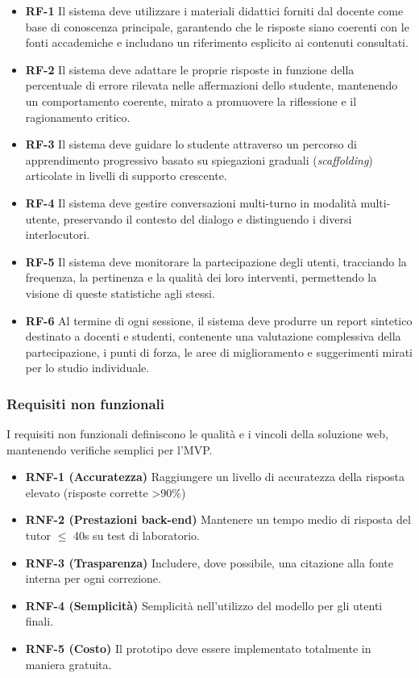 \documentclass[a4paper,9pt]{article}
\begin{document}
	\begin{itemize}
		\item \textbf{RF-1} Il sistema deve utilizzare i materiali didattici forniti dal docente come base di conoscenza principale, garantendo che le risposte siano coerenti con le fonti accademiche e includano un riferimento esplicito ai contenuti consultati.
		
  	    \item \textbf{RF-2} Il sistema deve adattare le proprie risposte in funzione della percentuale di errore rilevata nelle affermazioni dello studente, mantenendo un comportamento coerente, mirato a promuovere la riflessione e il ragionamento critico.
			
		\item \textbf{RF-3} Il sistema deve guidare lo studente attraverso un percorso di apprendimento progressivo basato su spiegazioni graduali (\emph{scaffolding}) articolate in livelli di supporto crescente.
		
		\item \textbf{RF-4} Il sistema deve gestire conversazioni multi-turno in modalità multi-utente, preservando il contesto del dialogo e distinguendo i diversi interlocutori.
		
		\item \textbf{RF-5} Il sistema deve monitorare la partecipazione degli utenti, tracciando la frequenza, la pertinenza e la qualità dei loro interventi, permettendo la visione di queste statistiche agli stessi.
		
		\item \textbf{RF-6} Al termine di ogni sessione, il sistema deve produrre un report sintetico destinato a docenti e studenti, contenente una valutazione complessiva della partecipazione, i punti di forza, le aree di miglioramento e suggerimenti mirati per lo studio individuale.
	\end{itemize}

	
	\subsubsection{Requisiti non funzionali}
	I requisiti non funzionali definiscono le qualità e i vincoli della soluzione web, mantenendo verifiche semplici per l’MVP.
	\begin{itemize}
		\item \textbf{RNF-1 (Accuratezza)} Raggiungere un livello di accuratezza della risposta elevato (risposte corrette >90\%)
		\item \textbf{RNF-2 (Prestazioni back-end)} Mantenere un tempo medio di risposta del tutor \ensuremath{\leq} 40s su test di laboratorio.
		\item \textbf{RNF-3 (Trasparenza)} Includere, dove possibile, una citazione alla fonte interna per ogni correzione.
		\item \textbf{RNF-4 (Semplicità)} Semplicità nell'utilizzo del modello per gli utenti finali.
		\item \textbf{RNF-5 (Costo)} Il prototipo deve essere implementato totalmente in maniera gratuita. 
	\end{itemize}
\end{document}
